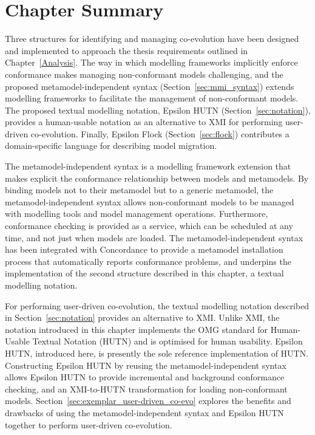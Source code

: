 





\section{Chapter Summary}
Three structures for identifying and managing co-evolution have been designed and implemented to approach the thesis requirements outlined in Chapter~\ref{Analysis}. The way in which modelling frameworks implicitly enforce conformance makes managing non-conformant models challenging, and the proposed metamodel-independent syntax (Section~\ref{sec:mmi_syntax}) extends modelling frameworks to facilitate the management of non-conformant models. The proposed textual modelling notation, Epsilon HUTN (Section~\ref{sec:notation}), provides a human-usable notation as an alternative to XMI for performing user-driven co-evolution. Finally, Epsilon Flock (Section~\ref{sec:flock}) contributes a domain-specific language for describing model migration.

The metamodel-independent syntax is a modelling framework extension that makes explicit the conformance relationship between models and metamodels. By binding models not to their metamodel but to a generic metamodel, the metamodel-independent syntax allows non-conformant models to be managed with modelling tools and model management operations. Furthermore, conformance checking is provided as a service, which can be scheduled at any time, and not just when models are loaded. The metamodel-independent syntax has been integrated with Concordance \cite{rose10concordance} to provide a metamodel installation process that automatically reports conformance problems, and underpins the implementation of the second structure described in this chapter, a textual modelling notation.

For performing user-driven co-evolution, the textual modelling notation described in Section~\ref{sec:notation} provides an alternative to XMI. Unlike XMI, the notation introduced in this chapter implements the OMG standard for Human-Usable Textual Notation (HUTN) \cite{hutn} and is optimised for human usability. Epsilon HUTN, introduced here, is presently the sole reference implementation of HUTN. Constructing Epsilon HUTN by reusing the metamodel-independent syntax allows Epsilon HUTN to provide incremental and background conformance checking, and an XMI-to-HUTN transformation for loading non-conformant models. Section~\ref{sec:exemplar_user-driven_co-evo} explores the benefits and drawbacks of using the metamodel-independent syntax and Epsilon HUTN together to perform user-driven co-evolution.


